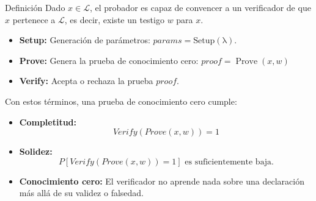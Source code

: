 \documentclass[8pt,xcolor=dvipsnames]{beamer}
\begin{document}
\begin{frame}[fragile]{Definición}
    Dado $x \in \mathcal{L}$, el probador es capaz de convencer a un verificador de que $x$ pertenece a $\mathcal{L}$, es decir, existe un testigo $w$ para $x$.
    \begin{itemize}
        \item \textbf{Setup:} Generación de parámetros: $params = \operatorname{Setup(\lambda)}$.
        \item \textbf{Prove:} Genera la prueba de conocimiento cero: $proof = \operatorname{Prove}(x, w)$
        \item \textbf{Verify:} Acepta o rechaza la prueba $proof$.
    \end{itemize}

    Con estos términos, una prueba de conocimiento cero cumple:
    \begin{itemize}
        \item \textbf{Completitud:} 
        $$Verify(Prove(x, w)) = 1$$
        \item \textbf{Solidez:}
        $$P[Verify(Prove(x, w)) = 1] \text{ es suficientemente baja.}$$
        \item \textbf{Conocimiento cero:} El verificador no aprende nada sobre una declaración más allá de su validez o falsedad.
    \end{itemize}
\end{frame}

\end{document}
